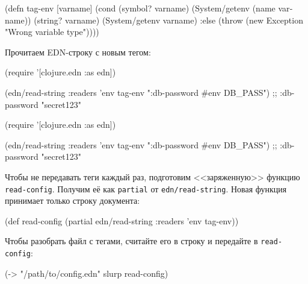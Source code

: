 \else

\begin{english}
  \begin{clojure}
(defn tag-env
  [varname]
  (cond
    (symbol? varname)
    (System/getenv (name varname))
    (string? varname)
    (System/getenv varname)
    :else
    (throw (new Exception "Wrong variable type"))))
  \end{clojure}
\end{english}

\fi

\noindent
Прочитаем EDN-строку с новым тегом:

\ifnarrow

\begin{english}
  \begin{clojure}
(require '[clojure.edn :as edn])

(edn/read-string
  {:readers {'env tag-env}}
  "{:db-password #env DB_PASS}")
;; {:db-password "secret123"}
  \end{clojure}
\end{english}

\else

\begin{english}
  \begin{clojure}
(require '[clojure.edn :as edn])

(edn/read-string {:readers {'env tag-env}}
                 "{:db-password #env DB_PASS}")
;; {:db-password "secret123"}
  \end{clojure}
\end{english}

\fi

Чтобы не передавать теги каждый раз, подготовим <<заряженную>> функцию
\verb|read-config|. Получим её как \verb|partial| от \verb|edn/read-string|.
Новая функция принимает только строку документа:

\begin{english}
  \begin{clojure}
(def read-config
  (partial edn/read-string
           {:readers {'env tag-env}}))
  \end{clojure}
\end{english}

Чтобы разобрать файл с тегами, считайте его в строку и передайте в
\verb|read-config|:

\begin{english}
  \begin{clojure}
(-> "/path/to/config.edn"
    slurp
    read-config)
  \end{clojure}
\end{english}

